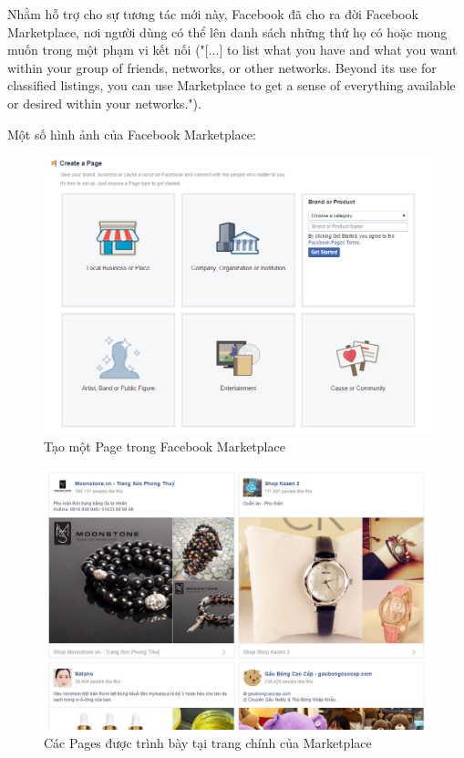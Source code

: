 Nhằm hỗ trợ cho sự tương tác mới này, Facebook đã cho ra đời Facebook Marketplace, nơi người dùng có thể lên danh sách những thứ họ có hoặc mong muốn trong một phạm vi kết nối ("[...] to list what you have and what you want within your group of friends, networks, or other networks. Beyond its use for classified listings, you can use Marketplace to get a sense of everything available or desired within your networks."\cite{facebooknote1}).

Một số hình ảnh của Facebook Marketplace:

\begin{figure}[H]
	\centering
	\includegraphics[scale=.4]{img/fb-create-page.PNG} 
	\caption{Tạo một Page trong Facebook Marketplace}
\end{figure}

\begin{figure}[H]
	\centering
	\includegraphics[scale=.4]{img/fb-shop.PNG} 
	\caption{Các Pages được trình bày tại trang chính của Marketplace}
\end{figure}

